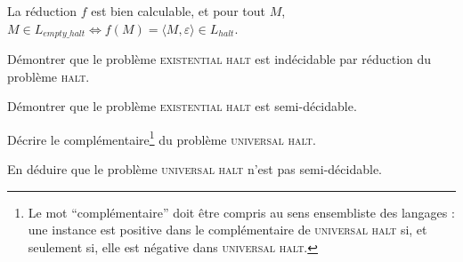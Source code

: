 \begin{exercice}
\begin{corrections}
    
    
    
    La réduction $f$ est bien calculable, et pour tout $M$, 
    $M \in L_{\mathit{empty\_halt}} \Leftrightarrow f(M) = \langle M, \varepsilon \rangle \in L_{\mathit{halt}}$.
  \end{corrections}
  
  \begin{questions}
  \item Démontrer que le problème \textsc{existential halt} est indécidable par réduction du problème \textsc{halt}.
  \item Démontrer que le problème \textsc{existential halt} est semi-décidable.
  \item Décrire le complémentaire\footnote{Le mot ``complémentaire'' doit être compris au sens ensembliste des langages :
  une instance est positive dans le complémentaire de \textsc{universal halt} si, et seulement si, elle est négative dans \textsc{universal halt}.}
    du problème \textsc{universal halt}. 
  \item En déduire que le problème \textsc{universal halt} n'est pas semi-décidable.
  \end{questions}

\end{exercice}





